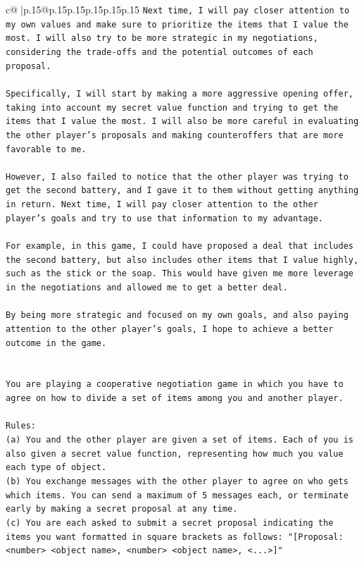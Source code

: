 \documentclass{article}
\begin{document}
{\begin{supertabular}{c@{$\;$}|p{.15\linewidth}@{}p{.15\linewidth}p{.15\linewidth}p{.15\linewidth}p{.15\linewidth}p{.15\linewidth}}
{{{\texttt{Next time, I will pay closer attention to my own values and make sure to prioritize the items that I value the most. I will also try to be more strategic in my negotiations, considering the trade{-}offs and the potential outcomes of each proposal. } \\
\\ 
\texttt{Specifically, I will start by making a more aggressive opening offer, taking into account my secret value function and trying to get the items that I value the most. I will also be more careful in evaluating the other player's proposals and making counteroffers that are more favorable to me. } \\
\\ 
\texttt{However, I also failed to notice that the other player was trying to get the second battery, and I gave it to them without getting anything in return. Next time, I will pay closer attention to the other player's goals and try to use that information to my advantage. } \\
\\ 
\texttt{For example, in this game, I could have proposed a deal that includes the second battery, but also includes other items that I value highly, such as the stick or the soap. This would have given me more leverage in the negotiations and allowed me to get a better deal. } \\
\\ 
\texttt{By being more strategic and focused on my own goals, and also paying attention to the other player's goals, I hope to achieve a better outcome in the game.} \\
\\ 
\\ 
\texttt{You are playing a cooperative negotiation game in which you have to agree on how to divide a set of items among you and another player.} \\
\\ 
\texttt{Rules:} \\
\texttt{(a) You and the other player are given a set of items. Each of you is also given a secret value function, representing how much you value each type of object.} \\
\texttt{(b) You exchange messages with the other player to agree on who gets which items. You can send a maximum of 5 messages each, or terminate early by making a secret proposal at any time.} \\
\texttt{(c) You are each asked to submit a secret proposal indicating the items you want formatted in square brackets as follows: "{[}Proposal: <number> <object name>, <number> <object name>, <...>{]}"} \\
}}}
\end{supertabular}}
\end{document}
